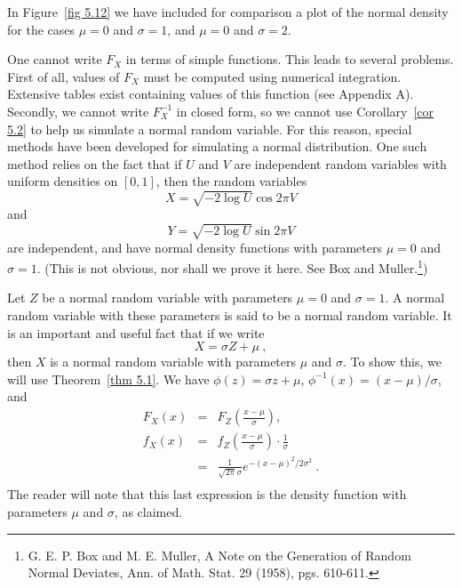 In Figure~\ref{fig 5.12} we have included for comparison a plot of the normal density
for the cases $\mu = 0$ and $\sigma = 1$, and $\mu = 0$ and $\sigma = 2$.


\par 
One cannot write $F_X$ in terms of simple functions.  This leads to several
problems.   First of all, values of $F_X$ must be computed using numerical
integration.  Extensive tables exist containing values of this function (see Appendix A).  
Secondly, we cannot write $F^{-1}_X$ in closed form, so we cannot use Corollary~\ref{cor 5.2} to help
us simulate a normal random variable.  For this reason, special methods have been developed for
simulating a normal distribution.  One such method relies on the fact that if $U$ and $V$ are
independent random variables with uniform densities on
$[0,1]$, then the random variables 
$$  X = \sqrt{-2\log U} \cos 2\pi V
$$ and
$$ Y = \sqrt{-2\log U} \sin 2\pi V
$$ are independent, and have normal density functions with parameters $\mu = 0$
and $\sigma = 1$.  (This is not obvious, nor shall we prove it here.  See Box and
Muller.\footnote{G. E. P. Box and M. E. Muller,  \emx
{A Note on the Generation of Random Normal Deviates}, Ann. of Math. Stat. 29 (1958), pgs.
610-611.})
\par Let $Z$ be a normal random variable with parameters $\mu = 0$ and $\sigma = 1$. A
normal random variable with these parameters is said to be a    normal
random variable.  It is an important and useful
fact that if we write
$$X = \sigma Z + \mu\ ,$$
then $X$ is a normal random variable with parameters $\mu$ and $\sigma$.  To show this,
we will use Theorem~\ref{thm 5.1}.  We have $\phi(z) = \sigma z + \mu$,
$\phi^{-1}(x) = (x - \mu)/\sigma$, and
\begin{eqnarray*} F_X(x) & = & F_Z\left(\frac {x - \mu}\sigma \right), \\ f_X(x) & = &
f_Z\left(\frac {x - \mu}\sigma \right) \cdot \frac 1\sigma \\
       & = & \frac 1{\sqrt{2\pi}\sigma} e^{-(x - \mu)^2/2\sigma^2}\ . \\
\end{eqnarray*}
The reader will note that this last expression is the density function with parameters
$\mu$ and $\sigma$, as claimed.
\par
